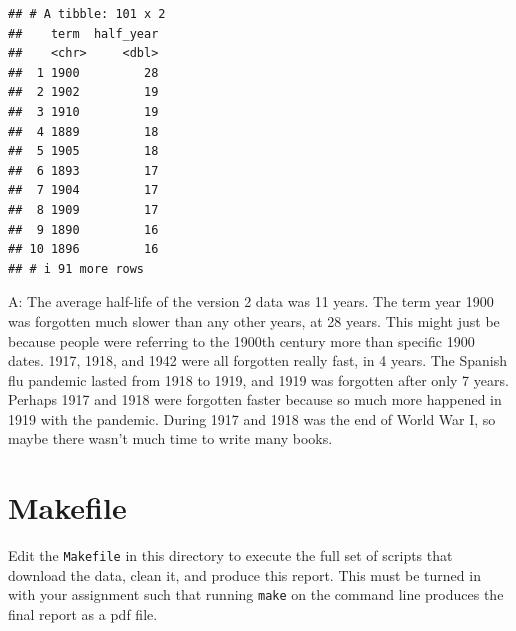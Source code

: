 \documentclass[
]{article}
\begin{document}
\begin{verbatim}
## # A tibble: 101 x 2
##    term  half_year
##    <chr>     <dbl>
##  1 1900         28
##  2 1902         19
##  3 1910         19
##  4 1889         18
##  5 1905         18
##  6 1893         17
##  7 1904         17
##  8 1909         17
##  9 1890         16
## 10 1896         16
## # i 91 more rows
\end{verbatim}

A: The average half-life of the version 2 data was 11 years. The term
year 1900 was forgotten much slower than any other years, at 28 years.
This might just be because people were referring to the 1900th century
more than specific 1900 dates. 1917, 1918, and 1942 were all forgotten
really fast, in 4 years. The Spanish flu pandemic lasted from 1918 to
1919, and 1919 was forgotten after only 7 years. Perhaps 1917 and 1918
were forgotten faster because so much more happened in 1919 with the
pandemic. During 1917 and 1918 was the end of World War I, so maybe
there wasn't much time to write many books.

\hypertarget{makefile}{%
\section{Makefile}\label{makefile}}

Edit the \texttt{Makefile} in this directory to execute the full set of
scripts that download the data, clean it, and produce this report. This
must be turned in with your assignment such that running \texttt{make}
on the command line produces the final report as a pdf file.
\end{document}
